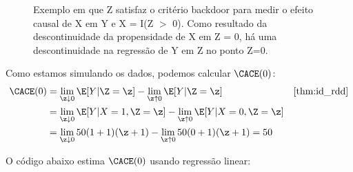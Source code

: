 \begin{example}
\begin{knitrout}
\begin{figure}[t]
{}

\caption[Exemplo em que Z satisfaz o critério backdoor para medir o efeito causal de X em Y e X = I(Z $>$ 0)]{Exemplo em que Z satisfaz o critério backdoor para medir o efeito causal de X em Y e X = I(Z $>$ 0). Como resultado da descontinuidade da propensidade de X em Z = 0, há uma descontinuidade na regressão de Y em Z no ponto Z=0.}\label{fig:rdd_ex_1_1}
\end{figure}

\end{knitrout}
 
 Como estamos simulando os dados,
 podemos calcular $\CACE(0)$:
 \begin{align*}
  \CACE(0) 
  &= \lim_{\z \downarrow 0}\E[Y|\Z=\z] 
  - \lim_{\z \uparrow 0}\E[Y|\Z=\z]
  & \text{\cref{thm:id_rdd}} \\
  &= \lim_{\z \downarrow 0}\E[Y|X=1,\Z=\z]
  - \lim_{\z \uparrow 0}\E[Y|X=0,\Z=\z] \\
  &= \lim_{\z \downarrow 0} 50(1+1)(\z+1)
  - \lim_{\z \uparrow 0} 50(0+1)(\z+1)
  = 50
 \end{align*}
\end{example}

O código abaixo estima $\CACE(0)$ usando regressão linear:

